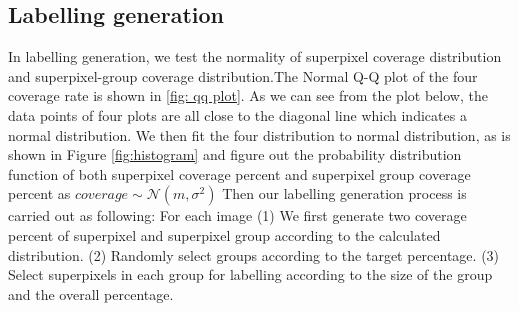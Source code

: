 \documentclass[runningheads,a4paper]{llncs}
\begin{document}
\subsection{Labelling generation}
In labelling generation, we test the normality of superpixel coverage distribution and superpixel-group coverage distribution.The Normal Q-Q plot of the four coverage rate is shown in \ref{fig: qq plot}. As we can see from the plot below, the data points of four plots are all close to the diagonal line which indicates a normal distribution. We then fit the four distribution to normal distribution, as is shown in Figure \ref{fig:histogram} and figure out the probability distribution function of both superpixel coverage percent and superpixel group coverage percent as $coverage \sim \mathcal{N} (m,\sigma^2)$
Then our labelling generation process is carried out as following: For each image (1) We first generate two coverage percent of superpixel and superpixel group according to the calculated  distribution. (2) Randomly select groups according to the target percentage. (3) Select superpixels in each group for labelling according to the size of the group and the overall percentage.
\end{document}
